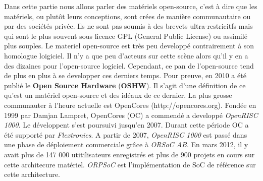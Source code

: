 \vspace{15px}
Dans cette partie nous allons parler des matériels open-source, c'est à dire que les matériels, ou plutôt leurs conceptions, sont crées de manière communautaire ou par des sociétés privée. Ils ne sont pas soumis à des brevets ultra-restricitfs mais qui sont le plus souvent sous licence GPL (General Public License) ou assimilé plus souples.
\medskip
Le materiel open-source est très peu developpé contrairement à son homologue loigiciel. Il n'y a que peu d'acteurs sur cette scène alors qu'il y en a des dizaines pour l'open-source logiciel. Cependant, ce pan de l'open-source tend de plus en plus à se developper ces derniers temps. Pour preuve, en 2010 a été publié le \textbf{Open Source Hardware} (\textbf{OSHW}). Il s'agit d'une définition de ce qu'est un matériel open-source et des idéaux de ce dernier.
\medskip
La plus grosse communauter à l'heure actuelle est OpenCores (http://opencores.org). Fondée en 1999 par Damjan Lampret, OpenCores (OC) a commendé a developpé \textit{OpenRISC 1000}. Le développent s'est poursuivi jusqu'en 2007. Durant cette période OC a été supporté par \textit{Flextronics}. A partir de 2007, \textit{OpenRISC 1000} est passé dans une phase de déploiement commerciale grâce à \textit{ORSoC AB}. En mars 2012, il y avait plus de 147 000 utitilisateurs enregistrés et plus de 900 projets en cours sur cette architecure matériel. \textit{ORPSoC} est l'implémentation de SoC de référence sur cette architecture.
\medskip
